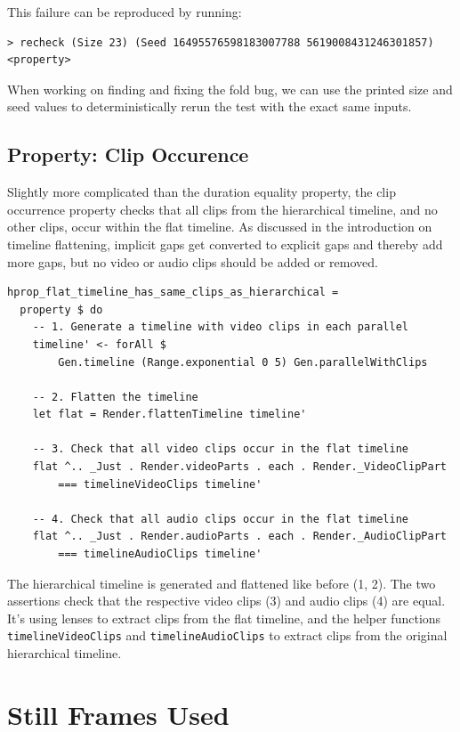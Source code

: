 This failure can be reproduced by running:
\begin{verbatim}
> recheck (Size 23) (Seed 16495576598183007788 5619008431246301857) <property>
\end{verbatim}
When working on finding and fixing the fold bug, we can use the printed size and seed values to deterministically rerun the test with the exact same inputs.

\subsection{Property: Clip Occurence}


Slightly more complicated than the duration equality property, the clip occurrence property checks that all clips from the hierarchical timeline, and no other clips, occur within the flat timeline. As discussed in the introduction on timeline flattening, implicit gaps get converted to explicit gaps and thereby add more gaps, but no video or audio clips should be added or removed.

\begin{verbatim}
hprop_flat_timeline_has_same_clips_as_hierarchical =
  property $ do
    -- 1. Generate a timeline with video clips in each parallel
    timeline' <- forAll $
        Gen.timeline (Range.exponential 0 5) Gen.parallelWithClips
    
    -- 2. Flatten the timeline
    let flat = Render.flattenTimeline timeline'
    
    -- 3. Check that all video clips occur in the flat timeline
    flat ^.. _Just . Render.videoParts . each . Render._VideoClipPart
        === timelineVideoClips timeline'
    
    -- 4. Check that all audio clips occur in the flat timeline
    flat ^.. _Just . Render.audioParts . each . Render._AudioClipPart
        === timelineAudioClips timeline'
\end{verbatim}
The hierarchical timeline is generated and flattened like before (1, 2). The two assertions check that the respective video clips (3) and audio clips (4) are equal. It's using lenses to extract clips from the flat timeline, and the helper functions \texttt{timelineVideoClips} and \texttt{timelineAudioClips} to extract clips from the original hierarchical timeline.


\section{Still Frames Used}

